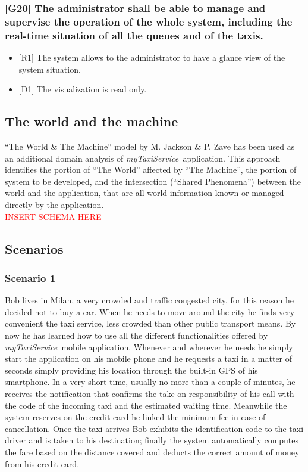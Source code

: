 \documentclass[a4paper,11pt]{report} %
\newcommand{\mts}{\mbox{\normalfont\itshape myTaxiService\ }}
\begin{document}
	\subsubsection{{[}G20{]} The administrator shall be able to manage and supervise the operation of the whole system, including the real-time situation of all the queues and of the taxis.}
	\begin{itemize}
		\item {[}R1{]} The system allows to the administrator to have a glance view of the system situation.
		\item {[}D1{]} The visualization is read only.
	\end{itemize}							
		
	\subsection{The world and the machine} ``The World \& The Machine''	model by M. Jackson \& P. Zave has been used as an additional domain analysis of \mts application. This approach identifies the portion of ``The World'' affected by ``The Machine'', the portion of system to be developed, and the intersection (``Shared Phenomena'') between the world and the application, that are all world information known or
	managed directly by the application.\\\textcolor{red}{INSERT SCHEMA HERE}
	
	\subsection{Scenarios}
	
	\subsubsection{Scenario 1} Bob lives in Milan, a very crowded and traffic congested city, for this reason he decided not to buy a car. When he needs to move around the city he finds very convenient the taxi service, less crowded than other public transport means. By now he has learned how to use all the different functionalities offered by \mts mobile application. Whenever and wherever he needs he simply start the application on his mobile phone and he requests a taxi in a matter of seconds simply providing his location through the built-in GPS of his smartphone. In a very short time, usually no more than a couple of minutes, he receives the notification that confirms the take on responsibility of his call with the code of the incoming taxi and the estimated waiting time. Meanwhile the system reserves on the credit card he linked the minimum fee in case of cancellation. Once the taxi arrives Bob exhibits the identification code to the taxi driver and is taken to his destination; finally the system automatically computes the fare based on the distance covered and deducts the correct amount of money from his credit card. 
	
\end{document}
